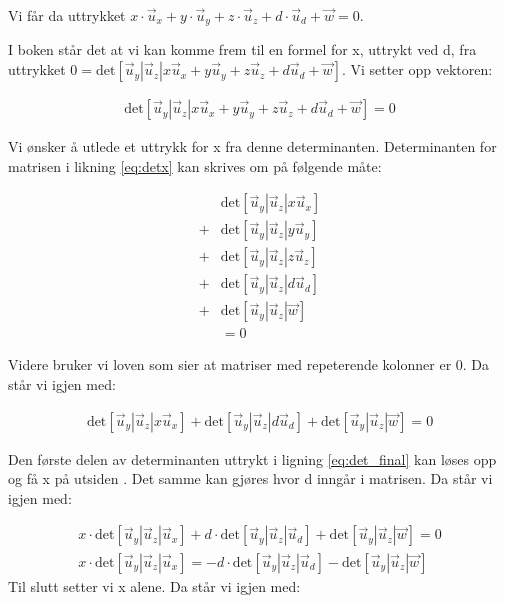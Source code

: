 Vi får da uttrykket $x\cdot{\vec u_x} + y\cdot{\vec u_y} + z\cdot{\vec u_z} + d\cdot{\vec u_d} + {\vec w} = 0$. \newpage


I boken står det at vi kan komme frem til en formel for x, uttrykt ved d, fra uttrykket $0=\text{det}[\vec{u}_y | \vec{u}_z | x\vec{u}_x + y\vec{u}_y + z\vec{u}_z + d\vec{u}_d + \vec{w}]$. Vi setter opp vektoren: 

\begin{align} \label{eq:detx}
	\text{det}[\vec{u}_y|\vec{u}_z |x\vec{u}_x + y\vec{u}_y + z\vec{u}_z + d\vec{u}_d + \vec{w}]=0
\end{align}

Vi ønsker å utlede et uttrykk for x fra denne determinanten. Determinanten for matrisen i likning \ref{eq:detx} kan skrives om på følgende måte: 

\begin{align}
	&\text{det}[\vec{u}_y|\vec{u}_z | x\vec{u}_x] \nonumber
	\\+ &\text{det}[\vec{u}_y|\vec{u}_z | y\vec{u}_y] \nonumber
	\\+ &\text{det}[\vec{u}_y|\vec{u}_z | z\vec{u}_z] \nonumber
	 \\+&\text{det}[\vec{u}_y|\vec{u}_z | d\vec{u}_d] \nonumber
	\\+ &\text{det}[\vec{u}_y|\vec{u}_z | \vec{w}]\nonumber
	\\&=0
\end{align}

Videre bruker vi loven som sier at matriser med repeterende kolonner er 0\cite{Determinants}. Da står vi igjen med: 

\begin{align} \label{eq:det_final}
	\text{det}[\vec{u}_y|\vec{u}_z | x\vec{u}_x] 
	+ \text{det}[\vec{u}_y|\vec{u}_z | d\vec{u}_d] 
	+ \text{det}[\vec{u}_y|\vec{u}_z | \vec{w}]
	=0
\end{align}

Den første delen av determinanten uttrykt i ligning \ref{eq:det_final} kan løses opp og få x på utsiden \cite{TheDeterminant}. Det samme kan gjøres hvor d inngår i matrisen. Da står vi igjen med: 

\begin{align}
	x\cdot\text{det}[\vec{u}_y|\vec{u}_z | \vec{u}_x] 
	+ d\cdot\text{det}[\vec{u}_y|\vec{u}_z | \vec{u}_d] 
	+ \text{det}[\vec{u}_y|\vec{u}_z | \vec{w}]
	=0 \nonumber 
	\\ 
	x\cdot\text{det}[\vec{u}_y|\vec{u}_z | \vec{u}_x] 
	= -d\cdot\text{det}[\vec{u}_y|\vec{u}_z | \vec{u}_d] 
	-\text{det}[\vec{u}_y|\vec{u}_z | \vec{w}]\nonumber 
\end{align}
Til slutt setter vi x alene. Da står vi igjen med: 

